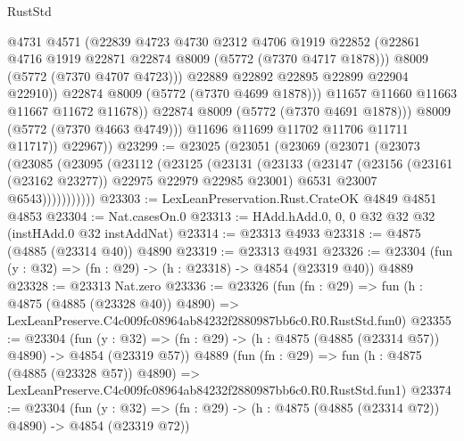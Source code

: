 \begin{lexlean}{RustStd}
\begin{coremodule}
                          @4731
                          @4571
                          (@22839
                            @4723
                            @4730
                            @2312
                            @4706
                            @1919
                            @22852
                            (@22861 @4716 @1919 @22871 @22874 @8009 (@5772 (@7370 @4717 @1878)))
                            @8009
                            (@5772 (@7370 @4707 @4723)))
                          @22889
                          @22892
                          @22895
                          @22899
                          @22904
                          @22910))
                      @22874
                      @8009
                      (@5772 (@7370 @4699 @1878)))
                    @11657
                    @11660
                    @11663
                    @11667
                    @11672
                    @11678))
                @22874
                @8009
                (@5772 (@7370 @4691 @1878)))
              @8009
              (@5772 (@7370 @4663 @4749)))
            @11696
            @11699
            @11702
            @11706
            @11711
            @11717))
        @22967))
@23299 := @23025
    (@23051
      (@23069
        (@23071
          (@23073
            (@23085
              (@23095
                (@23112
                  (@23125
                    (@23131
                      (@23133
                        (@23147
                          (@23156 (@23161 (@23162 @23277)) @22975 @22979 @22985 @23001)
                          @6531
                          @23007
                          @6543)))))))))))
@23303 := LexLeanPreservation.Rust.CrateOK @4849 @4851 @4853
@23304 := Nat.casesOn.{0}
@23313 := HAdd.hAdd.{0, 0, 0} @32 @32 @32 (instHAdd.{0} @32 instAddNat)
@23314 := @23313 @4933
@23318 := @4875 (@4885 (@23314 @40)) @4890
@23319 := @23313 @4931
@23326 := @23304 (fun (y : @32) => (fn : @29) -> (h : @23318) -> @4854 (@23319 @40)) @4889
@23328 := @23313 Nat.zero
@23336 := @23326
    (fun (fn : @29) =>
    fun (h : @4875 (@4885 (@23328 @40)) @4890) =>
    LexLeanPreserve.C4c009fc08964ab84232f2880987bb6c0.R0.RustStd.fun0)
@23355 := @23304
    (fun (y : @32) => (fn : @29) -> (h : @4875 (@4885 (@23314 @57)) @4890) -> @4854 (@23319 @57))
    @4889
    (fun (fn : @29) =>
    fun (h : @4875 (@4885 (@23328 @57)) @4890) =>
    LexLeanPreserve.C4c009fc08964ab84232f2880987bb6c0.R0.RustStd.fun1)
@23374 := @23304
    (fun (y : @32) => (fn : @29) -> (h : @4875 (@4885 (@23314 @72)) @4890) -> @4854 (@23319 @72))

\end{coremodule}
\end{lexlean}
